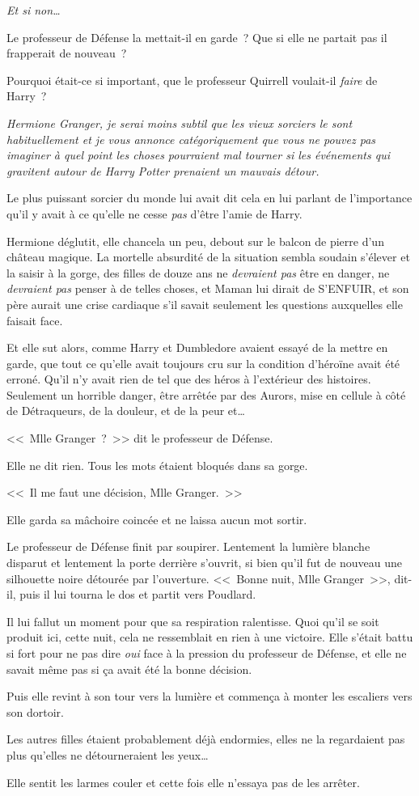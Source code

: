 \emph{Et si non…}

Le professeur de Défense la mettait-il en garde~? Que si elle ne partait pas il frapperait de nouveau~?

Pourquoi était-ce si important, que le professeur Quirrell voulait-il \emph{faire} de Harry~?

\emph{Hermione Granger, je serai moins subtil que les vieux sorciers le sont habituellement et je vous annonce catégoriquement que vous ne pouvez pas imaginer à quel point les choses pourraient mal tourner si les événements qui gravitent autour de Harry Potter prenaient un mauvais détour.}

Le plus puissant sorcier du monde lui avait dit cela en lui parlant de l'importance qu'il y avait à ce qu'elle ne cesse \emph{pas} d'être l'amie de Harry.

Hermione déglutit, elle chancela un peu, debout sur le balcon de pierre d'un château magique. La mortelle absurdité de la situation sembla soudain s'élever et la saisir à la gorge, des filles de douze ans ne \emph{devraient pas} être en danger, ne \emph{devraient pas} penser à de telles choses, et Maman lui dirait de S'ENFUIR, et son père aurait une crise cardiaque s'il savait seulement les questions auxquelles elle faisait face.

Et elle sut alors, comme Harry et Dumbledore avaient essayé de la mettre en garde, que tout ce qu'elle avait toujours cru sur la condition d'héroïne avait été erroné. Qu'il n'y avait rien de tel que des héros à l'extérieur des histoires. Seulement un horrible danger, être arrêtée par des Aurors, mise en cellule à côté de Détraqueurs, de la douleur, et de la peur et…

<<~Mlle Granger~?~>> dit le professeur de Défense.

Elle ne dit rien. Tous les mots étaient bloqués dans sa gorge.

<<~Il me faut une décision, Mlle Granger.~>>

Elle garda sa mâchoire coincée et ne laissa aucun mot sortir.

Le professeur de Défense finit par soupirer. Lentement la lumière blanche disparut et lentement la porte derrière s'ouvrit, si bien qu'il fut de nouveau une silhouette noire détourée par l'ouverture. <<~Bonne nuit, Mlle Granger~>>, dit-il, puis il lui tourna le dos et partit vers Poudlard.

Il lui fallut un moment pour que sa respiration ralentisse. Quoi qu'il se soit produit ici, cette nuit, cela ne ressemblait en rien à une victoire. Elle s'était battu si fort pour ne pas dire \emph{oui} face à la pression du professeur de Défense, et elle ne savait même pas si ça avait été la bonne décision.

Puis elle revint à son tour vers la lumière et commença à monter les escaliers vers son dortoir.

Les autres filles étaient probablement déjà endormies, elles ne la regardaient pas plus qu'elles ne détourneraient les yeux…

Elle sentit les larmes couler et cette fois elle n'essaya pas de les arrêter.
